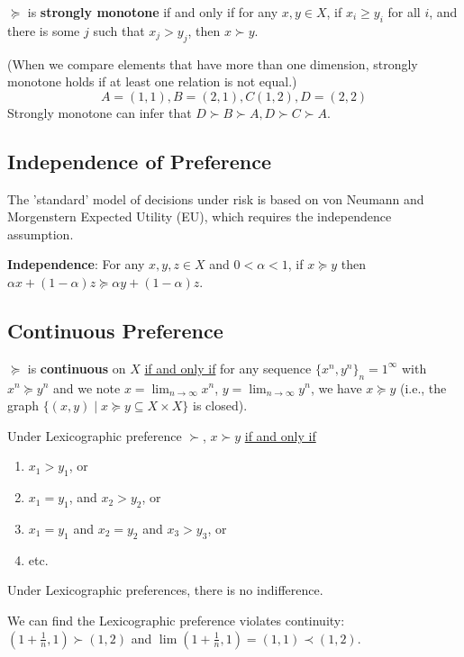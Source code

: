 \documentclass[11pt]{elegantbook}
\begin{document}
\begin{definition}
    \normalfont
    $\succeq$ is \textbf{strongly monotone} if and only if for any $x, y \in X$, if $x_{i} \geq y_{i}$ for all $i$, and there is some $j$ such that $x_{j}>y_{j}$, then $x \succ y$.
\end{definition}
(When we compare elements that have more than one dimension, strongly monotone holds if at least one relation is not equal.)
$$
A=(1,1), B=(2,1), C(1,2), D=(2,2)
$$
Strongly monotone can infer that $D \succ B \succ A, D \succ C \succ A$.

\subsection{Independence of Preference}
The 'standard' model of decisions under risk is based on von Neumann and Morgenstern Expected Utility (EU), which requires the independence assumption.
\begin{definition}
    \normalfont
    \textbf{Independence}: For any $x,y,z\in X$ and $0<\alpha<1$, if $x\succeq y$ then $\alpha x+(1-\alpha)z \succeq \alpha y+(1-\alpha)z$.
\end{definition}



\subsection{Continuous Preference}
\begin{definition}
    \normalfont
    $\succeq$ is \textbf{continuous} on $X$ \underline{if and only if} for any sequence $\{x^n,y^n\}_n=1^\infty$ with $x^n\succeq y^n$ and we note $x=\lim_{n \rightarrow \infty}x^n$, $y=\lim_{n \rightarrow \infty}y^n$, we have $x\succeq y$ (i.e., the graph $\{(x,y)\mid x\succeq y\subseteq X\times X\}$ is closed).
\end{definition}
\begin{example}
    Under Lexicographic preference $\succ$, $x \succ y$ \underline{if and only if}
    \begin{enumerate}[$\circ$]
        \item $x_{1}>y_{1}$, or
        \item $x_{1}=y_{1}$, and $x_{2}>y_{2}$, or
        \item $x_{1}=y_{1}$ and $x_{2}=y_{2}$ and $x_{3}>y_{3}$, or
        \item etc.
    \end{enumerate}
    Under Lexicographic preferences, there is no indifference.
    
    We can find the Lexicographic preference violates continuity: $\left(1+\frac{1}{n}, 1\right) \succ(1,2)$ and $\lim \left(1+\frac{1}{n}, 1\right)=(1,1) \prec(1,2)$.
\end{example}
\end{document}
